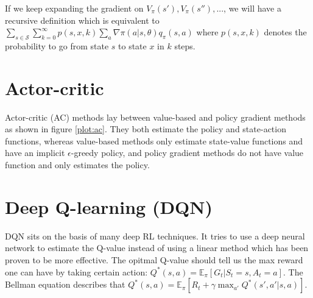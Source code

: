\documentclass{article}
\begin{document}
\begin{multicols*}{2}
		If we keep expanding the gradient on $ V_\pi(s'), V_\pi(s''), ... $, we will have  
		a recursive definition which is equivalent to $ \sum_{s \in \mathcal{S}} \sum_{k=0}^\infty p(s, x, k)  \sum_ a \nabla \pi(a | s, \theta) q_\pi(s, a) $ where 
		$ p(s, x, k) $ denotes the probability to go from state $ s $ to state $ x $ in $ k $ steps. 
		
		\section*{Actor-critic}
		\begin{center}
		\label{plot:ac}
		\end{center}
		
		 Actor-critic  (AC) methods lay between value-based and policy gradient methods as shown in figure \ref{plot:ac}. They both estimate the policy and state-action functions, whereas value-based methods only estimate state-value functions and have an implicit $\epsilon$-greedy policy, and policy gradient methods do not have value function and only estimates the policy.
		
		\section*{Deep Q-learning (DQN)}
		 DQN sits on the basis of many deep RL techniques. It tries to use a deep neural network to estimate the Q-value instead of using a linear method which has been proven to be more effective. The opitmal Q-value should tell us the max reward one can have by taking certain action: $ Q^*(s, a) = \mathbb{E}_{\pi} [G_t | S_t=s, A_t=a ] $. The Bellman equation describes that $ Q^*(s, a) = \mathbb{E}_{\pi} [R_t + \gamma \max_{a'} Q^*(s', a' | s, a)] $.  \\
		

\end{multicols*}
\end{document}
